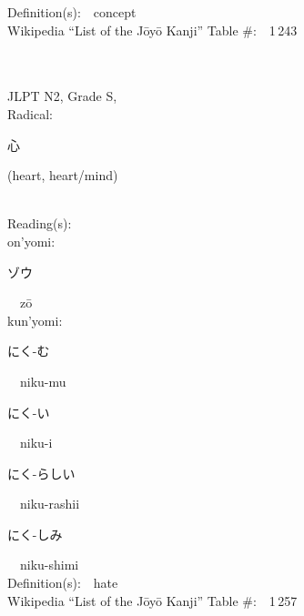 \begin{multicols}{2}
Definition(s):\ \ concept \\
Wikipedia ``List of the J\=oy\=o Kanji'' Table \#:\ \ 1\,243 \\
\ \ \\
{\fontsize{34pt}{40pt}  }\ \ \\  %
{JLPT N2, Grade S, \\Radical:\ \ {\begin{CJK}{UTF8}{min} 心 \end{CJK}} (heart, heart/mind) } \\
Reading(s):\ \ \\
{\hspace*{1em}}on'yomi:\ \ \\
{\hspace*{2em}}{\begin{CJK}{UTF8}{min} ゾウ \end{CJK}}\ \ z\=o\ \ \\
{\hspace*{1em}}kun'yomi:\ \ \\
{\hspace*{2em}}{\begin{CJK}{UTF8}{min} にく-む \end{CJK}}\ \ niku-mu\ \ \\
{\hspace*{2em}}{\begin{CJK}{UTF8}{min} にく-い \end{CJK}}\ \ niku-i\ \ \\
{\hspace*{2em}}{\begin{CJK}{UTF8}{min} にく-らしい \end{CJK}}\ \ niku-rashii\ \ \\
{\hspace*{2em}}{\begin{CJK}{UTF8}{min} にく-しみ \end{CJK}}\ \ niku-shimi\ \ \\
Definition(s):\ \ hate \\
Wikipedia ``List of the J\=oy\=o Kanji'' Table \#:\ \ 1\,257 \\
\ \ \\
{\fontsize{34pt}{40pt}  }\ \ \\  %

\end{multicols}
